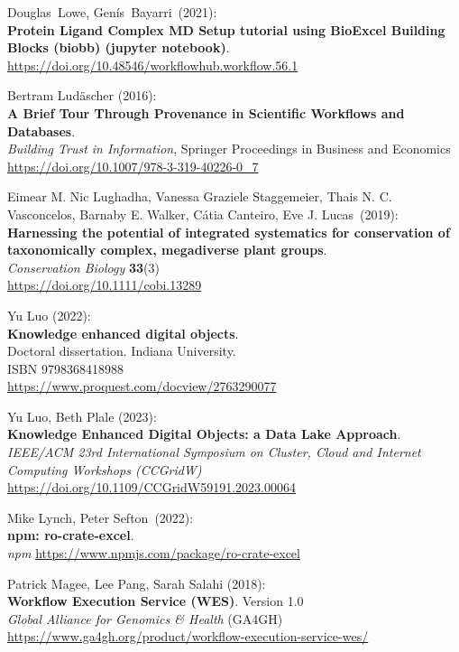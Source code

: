 \begin{thebibliography}{9}
Douglas~Lowe, Genís~Bayarri~(2021):\\
\textbf{Protein Ligand Complex MD Setup tutorial using BioExcel Building
Blocks (biobb) (jupyter notebook)}.\\
\url{https://doi.org/10.48546/workflowhub.workflow.56.1}

Bertram Ludäscher (2016):\\
\textbf{A Brief Tour Through Provenance in Scientific Workflows and Databases}.\\
\emph{Building Trust in Information}, Springer Proceedings in Business and Economics \\
\url{https://doi.org/10.1007/978-3-319-40226-0_7}

Eimear M. Nic Lughadha, Vanessa Graziele Staggemeier, Thais N. C. Vasconcelos, Barnaby E. Walker, Cátia Canteiro, Eve J. Lucas~(2019):\\
\textbf{Harnessing the potential of integrated systematics for conservation of taxonomically complex, megadiverse plant groups}.\\ 
\emph{Conservation Biology} \textbf{33}(3)\\
\url{https://doi.org/10.1111/cobi.13289}

Yu Luo (2022):\\
\textbf{Knowledge enhanced digital objects}.\\
Doctoral dissertation. Indiana University.\\
ISBN 9798368418988 \\
\url{https://www.proquest.com/docview/2763290077}

Yu Luo, Beth Plale (2023):\\
\textbf{Knowledge Enhanced Digital Objects: a Data Lake Approach}.\\
\emph{IEEE/ACM 23rd International Symposium on Cluster, Cloud and Internet Computing Workshops (CCGridW)}\\
\url{https://doi.org/10.1109/CCGridW59191.2023.00064}

Mike Lynch, Peter Sefton~(2022):\\
\textbf{npm: ro-crate-excel}.\\
\emph{npm} \url{https://www.npmjs.com/package/ro-crate-excel}

Patrick Magee, Lee Pang, Sarah Salahi (2018):\\
\textbf{Workflow Execution Service (WES)}. Version 1.0\\
\emph{Global Alliance for Genomics \& Health} (GA4GH)\\
\url{https://www.ga4gh.org/product/workflow-execution-service-wes/}


\end{thebibliography}
